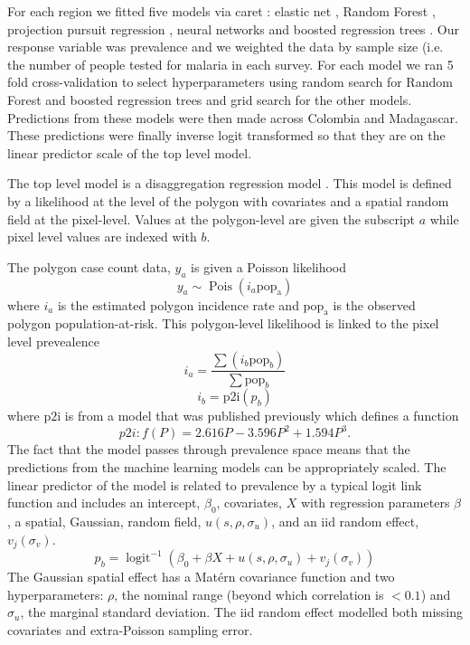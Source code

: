 \documentclass[11pt]{article}
\begin{document}
For each region we fitted five models via caret \citep{caret}: elastic net \citep{enet}, Random Forest \citep{wright2015ranger}, projection pursuit regression \citep{friedman1981projection}, neural networks \citep{nnet} and boosted regression trees \citep{gbm}.
Our response variable was prevalence and we weighted the data by sample size (i.e. the number of people tested for malaria in each survey.
For each model we ran 5 fold cross-validation to select hyperparameters using random search for Random Forest and boosted regression trees and grid search for the other models. 
Predictions from these models were then made across Colombia and Madagascar.
These predictions were finally inverse logit transformed so that they are on the linear predictor scale of the top level model.

The top level model is a disaggregation regression model \citep{sturrock2014fine, wilson2017pointless, law2018variational, taylor2017continuous, li2012log}.
This model is defined by a likelihood at the level of the polygon with covariates and a spatial random field at the pixel-level. 
Values at the polygon-level are given the subscript $a$ while pixel level values are indexed with $b$.

The polygon case count data, $y_a$ is given a Poisson likelihood
$$y_a \sim \operatorname{Pois}(i_a\mathrm{pop_a})$$
where $i_a$ is the estimated polygon incidence rate and $\mathrm{pop_a}$ is the observed polygon population-at-risk. 
This polygon-level likelihood is linked to the pixel level prevealence 
$$i_a = \frac{ \sum(i_b \mathrm{pop}_b)}{\sum  \mathrm{pop}_b} $$
$$i_b = \mathrm{p2i}(p_b)$$
where $\mathrm{p2i}$ is from a model that was published previously \citep{cameron2015defining} which defines a function
$${p2i}: f\left(P\right) = 2.616P - 3.596P^2 + 1.594P^3.$$
The fact that the model passes through prevalence space means that the predictions from the machine learning models can be appropriately scaled.
The linear predictor of the model is related to prevalence by a typical logit link function and includes an intercept, $\beta_0$, covariates, $X$ with regression parameters $\beta$, a spatial, Gaussian, random field, $u(s, \rho, \sigma_u)$, and an iid random effect, $v_j(\sigma_v)$.
$$p_b = \operatorname{logit}^{-1}\left(\beta_0 + \beta X  + u(s, \rho, \sigma_u) + v_j(\sigma_v)\right)$$
The Gaussian spatial effect has a Mat\'ern covariance function and two hyperparameters: $\rho$, the nominal range (beyond which correlation is $< 0.1$) and $\sigma_u$, the marginal standard deviation.
The iid random effect modelled both missing covariates and extra-Poisson sampling error.
\end{document}
